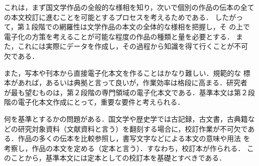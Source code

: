 これは，まず国文学作品の全般的な様相を知り，次いで個別の作品の伝本の全て
の本文校訂に進むことを可能とするプロセスを考えるためである．
したがって，第１段階での網羅性は文学作品の本文の全体的な様相を把握し，そ
の上で電子化の方策を考えることが可能な程度の作品の種類と量を必要とする．
また，これには実際にデータを作成し，その過程から知識を得て行くことが不可
欠である．

また，写本や刊本\yougo から直接電子化本文を作ることはかなり難しい．規範的な
標本があれば，あるいは典拠と言って良いが，作業効率は格段に高まる．研究者
が最も望むものは，第２段階の専門領域の電子化本文である．基準本文は第２段
階の電子化本文作成にとって，重要な要件と考えられる．

何を基準とするかの問題がある．国文学や歴史学では古記録，古文書，古典籍な
どの研究対象資料（文献資料と言う）を翻刻する場合に，校訂作業が不可欠であ
る．作品の多くの伝本\yougo を比較参照し，書写文字などによる本文の意味や用法
を考察し，作品の本文を定める（定本と言う）．すなわち，校訂本が作られる．
このことから，基準本文には定本としての校訂本を基礎とすべきである．

